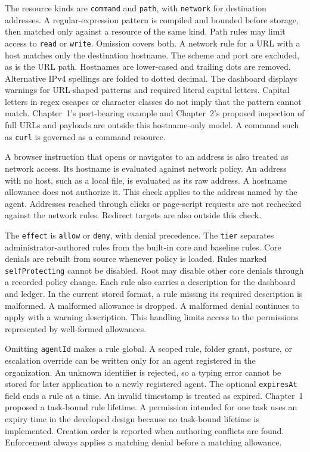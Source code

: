{\color{red}The resource kinds are \texttt{command} and \texttt{path}, with
\texttt{network} for destination addresses. A regular-expression pattern is compiled and bounded before
storage, then matched only against a resource of the same kind. Path rules may
limit access to \texttt{read} or \texttt{write}. Omission covers both. A
network rule for a URL with a host matches only the destination hostname.
The scheme and port are excluded, as is the URL path. Hostnames are lower-cased
and trailing dots are removed. Alternative IPv4 spellings are folded to dotted decimal. The
dashboard displays warnings for URL-shaped patterns and required literal
capital letters. Capital letters in regex escapes or character classes do not imply
that the pattern cannot match. Chapter~1's port-bearing example and
Chapter~2's proposed inspection of full URLs and payloads are outside this
hostname-only model. A command such as \texttt{curl} is governed as a command
resource.

A browser instruction that opens or navigates to an address is also treated as
network access. Its hostname is evaluated against network policy. An address
with no host, such as a local file, is evaluated as its raw address. A hostname
allowance does not authorize it. This check applies to the address named by the
agent. Addresses reached through clicks or page-script requests are not
rechecked against the network rules. Redirect targets are also outside this check.

The \texttt{effect} is \texttt{allow} or \texttt{deny}, with denial precedence.
The \texttt{tier} separates administrator-authored rules from the built-in
core and baseline rules. Core denials are rebuilt from source whenever policy is loaded. Rules
marked \texttt{selfProtecting} cannot be disabled. Root may disable other core
denials through a recorded policy change. Each rule also carries a description
for the dashboard and ledger. In the current stored format, a rule missing its
required description is malformed. A malformed allowance is dropped. A
malformed denial continues to apply with a warning description. This handling
limits access to the permissions represented by well-formed allowances.

Omitting \texttt{agentId} makes a rule global. A scoped rule, folder grant,
posture, or escalation override can be written only for an agent registered in
the organization. An unknown identifier is rejected, so a typing error cannot
be stored for later application to a newly registered agent. The optional
\texttt{expiresAt} field ends a rule at a time. An invalid timestamp is treated
as expired. Chapter~1 proposed a task-bound rule lifetime. A permission
intended for one task uses an expiry time in the developed design because no
task-bound lifetime is implemented. Creation order is reported when authoring
conflicts are found. Enforcement always applies a matching denial before a
matching allowance.}

